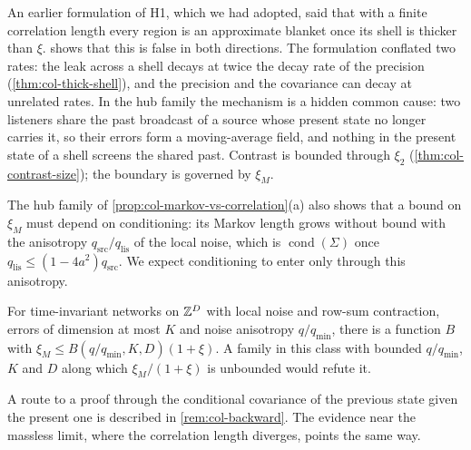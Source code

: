 \begin{remark}\label{rem:col-shell-error}
An earlier formulation of H1, which we had adopted, said that with a finite correlation length every region is an approximate blanket once its shell is thicker than $\xi$.  shows that this is false in both directions. The formulation conflated two rates: the leak across a shell decays at twice the decay rate of the precision (\cref{thm:col-thick-shell}), and the precision and the covariance can decay at unrelated rates. In the hub family the mechanism is a hidden common cause: two listeners share the past broadcast of a source whose present state no longer carries it, so their errors form a moving-average field, and nothing in the present state of a shell screens the shared past. Contrast is bounded through $\xi_2$ (\cref{thm:col-contrast-size}); the boundary is governed by $\xi_M$.
\end{remark}

The hub family of \cref{prop:col-markov-vs-correlation}(a) also shows that a bound on $\xi_M$ must depend on conditioning: its Markov length grows without bound with the anisotropy $q_{\mathrm{src}}/q_{\mathrm{lis}}$ of the local noise, which is $\operatorname{cond}(\Sigma)$ once $q_{\mathrm{lis}}\le(1-4a^2)q_{\mathrm{src}}$. We expect conditioning to enter only through this anisotropy.

\begin{conjecture}\label{conj:col-markov-length}
For time-invariant networks on $\mathbb{Z}^D$ with local noise and row-sum contraction, errors of dimension at most $K$ and noise anisotropy $q/q_{\min}$, there is a function $B$ with $\xi_M\le B(q/q_{\min},K,D)(1+\xi)$. A family in this class with bounded $q/q_{\min}$, $K$ and $D$ along which $\xi_M/(1+\xi)$ is unbounded would refute it.
\end{conjecture}
A route to a proof through the conditional covariance of the previous state given the present one is described in \cref{rem:col-backward}. The evidence near the massless limit, where the correlation length diverges, points the same way.


